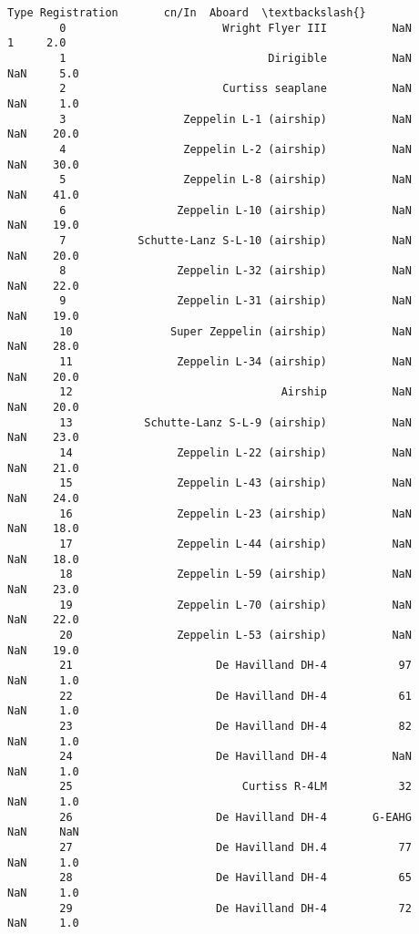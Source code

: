 \documentclass[11pt]{article}
\begin{document}
\begin{Verbatim}[commandchars=\\\{\}]
                                             Type Registration       cn/In  Aboard  \textbackslash{}
        0                        Wright Flyer III          NaN           1     2.0   
        1                               Dirigible          NaN         NaN     5.0   
        2                        Curtiss seaplane          NaN         NaN     1.0   
        3                  Zeppelin L-1 (airship)          NaN         NaN    20.0   
        4                  Zeppelin L-2 (airship)          NaN         NaN    30.0   
        5                  Zeppelin L-8 (airship)          NaN         NaN    41.0   
        6                 Zeppelin L-10 (airship)          NaN         NaN    19.0   
        7           Schutte-Lanz S-L-10 (airship)          NaN         NaN    20.0   
        8                 Zeppelin L-32 (airship)          NaN         NaN    22.0   
        9                 Zeppelin L-31 (airship)          NaN         NaN    19.0   
        10               Super Zeppelin (airship)          NaN         NaN    28.0   
        11                Zeppelin L-34 (airship)          NaN         NaN    20.0   
        12                                Airship          NaN         NaN    20.0   
        13           Schutte-Lanz S-L-9 (airship)          NaN         NaN    23.0   
        14                Zeppelin L-22 (airship)          NaN         NaN    21.0   
        15                Zeppelin L-43 (airship)          NaN         NaN    24.0   
        16                Zeppelin L-23 (airship)          NaN         NaN    18.0   
        17                Zeppelin L-44 (airship)          NaN         NaN    18.0   
        18                Zeppelin L-59 (airship)          NaN         NaN    23.0   
        19                Zeppelin L-70 (airship)          NaN         NaN    22.0   
        20                Zeppelin L-53 (airship)          NaN         NaN    19.0   
        21                      De Havilland DH-4           97         NaN     1.0   
        22                      De Havilland DH-4           61         NaN     1.0   
        23                      De Havilland DH-4           82         NaN     1.0   
        24                      De Havilland DH-4          NaN         NaN     1.0   
        25                          Curtiss R-4LM           32         NaN     1.0   
        26                      De Havilland DH-4       G-EAHG         NaN     NaN   
        27                      De Havilland DH.4           77         NaN     1.0   
        28                      De Havilland DH-4           65         NaN     1.0   
        29                      De Havilland DH-4           72         NaN     1.0   

\end{Verbatim}
\end{document}
